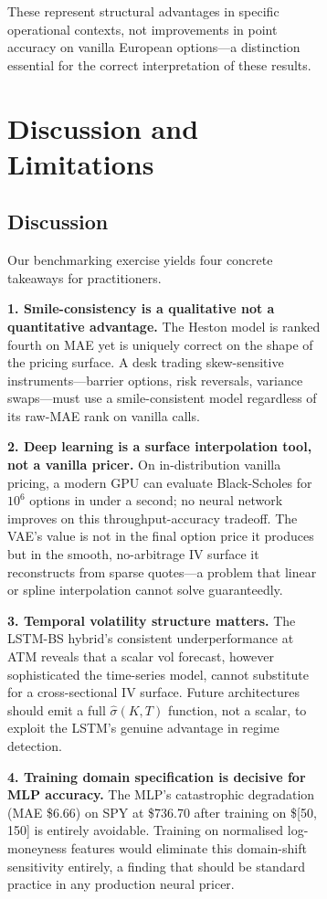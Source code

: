 \documentclass[12pt,a4paper]{article}
\begin{document}
\begin{figure}[H]
\begin{figure}[H]
These represent structural advantages in specific operational contexts, not
improvements in point accuracy on vanilla European options---a distinction
essential for the correct interpretation of these results.

\section{Discussion and Limitations}
\label{sec:discussion}

\subsection{Discussion}

Our benchmarking exercise yields four concrete takeaways for practitioners.

\textbf{1. Smile-consistency is a qualitative not a quantitative advantage.}
The Heston model is ranked fourth on MAE yet is uniquely correct on the shape
of the pricing surface.
A desk trading skew-sensitive instruments—barrier options, risk reversals,
variance swaps—must use a smile-consistent model regardless of its raw-MAE
rank on vanilla calls.

\textbf{2. Deep learning is a surface interpolation tool, not a vanilla pricer.}
On in-distribution vanilla pricing, a modern GPU can evaluate Black-Scholes
for $10^6$ options in under a second; no neural network improves on this
throughput-accuracy tradeoff.
The VAE's value is not in the final option price it produces but in the
smooth, no-arbitrage IV surface it reconstructs from sparse quotes---a problem
that linear or spline interpolation cannot solve guaranteedly.

\textbf{3. Temporal volatility structure matters.}
The LSTM-BS hybrid's consistent underperformance at ATM reveals that a scalar
vol forecast, however sophisticated the time-series model, cannot substitute
for a cross-sectional IV surface.
Future architectures should emit a full $\hat{\sigma}(K, T)$ function, not a
scalar, to exploit the LSTM's genuine advantage in regime detection.

\textbf{4. Training domain specification is decisive for MLP accuracy.}
The MLP's catastrophic degradation (MAE \$6.66) on SPY at \$736.70 after
training on \$[50, 150] is entirely avoidable.
Training on normalised log-moneyness features would eliminate this
domain-shift sensitivity entirely, a finding that should be standard practice
in any production neural pricer.


\end{figure}
\end{figure}
\end{document}
